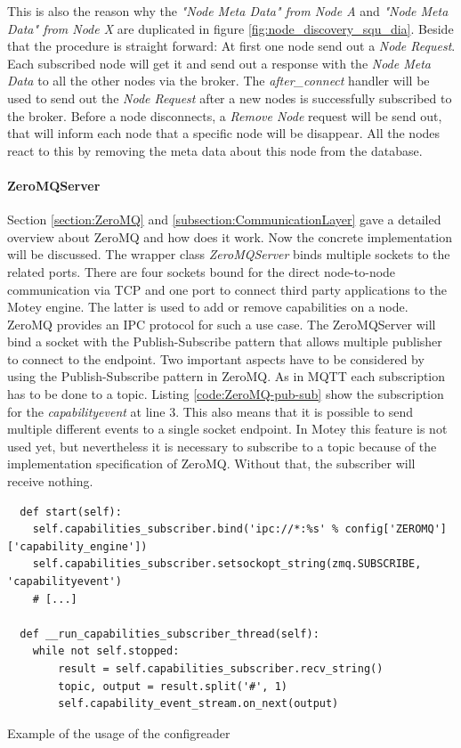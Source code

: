 This is also the reason why the \textit{"Node Meta Data" from Node A} and \textit{"Node Meta Data" from Node X} are duplicated in figure \ref{fig:node_discovery_squ_dia}.
Beside that the procedure is straight forward: At first one node send out a \textit{Node Request}.
Each subscribed node will get it and send out a response with the \textit{Node Meta Data} to all the other nodes via the broker.
The \textit{after\_connect} handler will be used to send out the \textit{Node Request} after a new nodes is successfully subscribed to the broker.
Before a node disconnects, a \textit{Remove Node} request will be send out, that will inform each node that a specific node will be disappear.
All the nodes react to this by removing the meta data about this node from the database.

\paragraph{ZeroMQServer}
Section \ref{section:ZeroMQ} and \ref{subsection:CommunicationLayer} gave a detailed overview about ZeroMQ and how does it work.
Now the concrete implementation will be discussed.
The wrapper class \textit{ZeroMQServer} binds multiple sockets to the related ports.
There are four sockets bound for the direct node-to-node communication via \ac{TCP} and one port to connect third party applications to the Motey engine.
The latter is used to add or remove capabilities on a node.
ZeroMQ provides an \ac{IPC} protocol for such a use case.
The ZeroMQServer will bind a socket with the Publish-Subscribe pattern that allows multiple publisher to connect to the endpoint.
Two important aspects have to be considered by using the Publish-Subscribe pattern in ZeroMQ.
As in \ac{MQTT} each subscription has to be done to a topic.
Listing \ref{code:ZeroMQ-pub-sub} show the subscription for the \textit{capabilityevent} at line 3.
This also means that it is possible to send multiple different events to a single socket endpoint.
In Motey this feature is not used yet, but nevertheless it is necessary to subscribe to a topic because of the implementation specification of ZeroMQ.
Without that, the subscriber will receive nothing.\newline

\begin{listing}[H]
  \begin{verbatim}
  def start(self):
    self.capabilities_subscriber.bind('ipc://*:%s' % config['ZEROMQ']['capability_engine'])
    self.capabilities_subscriber.setsockopt_string(zmq.SUBSCRIBE, 'capabilityevent')
    # [...]

  def __run_capabilities_subscriber_thread(self):
    while not self.stopped:
        result = self.capabilities_subscriber.recv_string()
        topic, output = result.split('#', 1)
        self.capability_event_stream.on_next(output)
  \end{verbatim}
  \caption{Example of the usage of the configreader}
  \label{code:ZeroMQ-pub-sub}
\end{listing}

